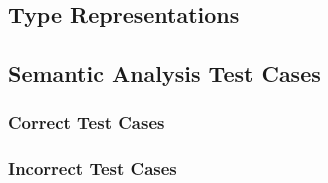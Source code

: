 \subsection{Type Representations}
\label{app:semantic/types_doc}



\clearpage

\subsection{Semantic Analysis Test Cases}
\label{app:semantic/testcases}

\subsubsection{Correct Test Cases}
\label{app:semantic/correct}




\clearpage %

\subsubsection{Incorrect Test Cases}
\label{app:semantic/incorrect}



%
%
